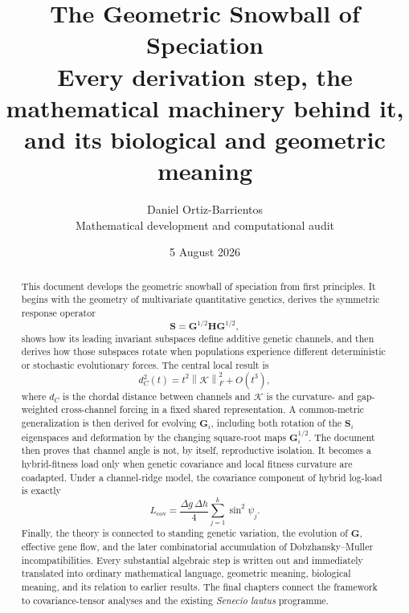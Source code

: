 \documentclass[11pt,a4paper,oneside]{report}
\title{\textbf{The Geometric Snowball of Speciation}\\[0.6em]
\Large Every derivation step, the mathematical machinery behind it, and its biological and geometric meaning}
\author{Daniel Ortiz-Barrientos\\\small Mathematical development and computational audit}
\date{5 August 2026}
\numberwithin{equation}{chapter}
\newcommand{\G}{\mathbf{G}}
\newcommand{\Hh}{\mathbf{H}}
\newcommand{\Sop}{\mathbf{S}}
\newcommand{\cK}{\mathcal K}
\newcommand{\normF}[1]{\left\lVert #1\right\rVert_F}
\begin{document}
\hypersetup{pageanchor=false}
\maketitle

\begin{abstract}
This document develops the geometric snowball of speciation from first principles. It begins with the geometry of multivariate quantitative genetics, derives the symmetric response operator
\[
\Sop=\G^{1/2}\Hh\G^{1/2},
\]
shows how its leading invariant subspaces define additive genetic channels, and then derives how those subspaces rotate when populations experience different deterministic or stochastic evolutionary forces. The central local result is
\[
d_C^2(t)=t^2\normF{\cK}^2+O(t^3),
\]
where \(d_C\) is the chordal distance between channels and \(\cK\) is the curvature- and gap-weighted cross-channel forcing in a fixed shared representation. A common-metric generalization is then derived for evolving \(\G_i\), including both rotation of the \(\Sop_i\) eigenspaces and deformation by the changing square-root maps \(\G_i^{1/2}\). The document then proves that channel angle is not, by itself, reproductive isolation. It becomes a hybrid-fitness load only when genetic covariance and local fitness curvature are coadapted. Under a channel-ridge model, the covariance component of hybrid log-load is exactly
\[
L_{\mathrm{cov}}=\frac{\Delta g\,\Delta h}{4}\sum_{j=1}^k\sin^2\psi_j.
\]
Finally, the theory is connected to standing genetic variation, the evolution of \(\G\), effective gene flow, and the later combinatorial accumulation of Dobzhansky--Muller incompatibilities. Every substantial algebraic step is written out and immediately translated into ordinary mathematical language, geometric meaning, biological meaning, and its relation to earlier results. The final chapters connect the framework to covariance-tensor analyses and the existing \textit{Senecio lautus} programme.
\end{abstract}
\clearpage
\hypersetup{pageanchor=true}




































\end{document}
